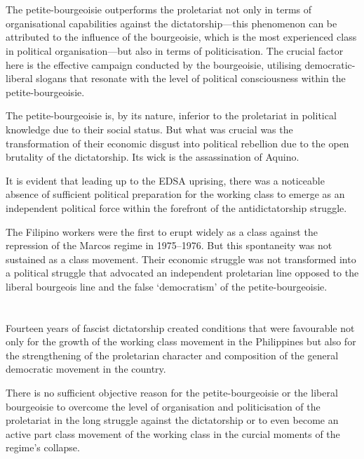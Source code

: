 \section{}
The petite-bourgeoisie outperforms the proletariat 
not only in terms of organisational capabilities 
against the dictatorship---this 
phenomenon can be attributed 
to the influence of the bourgeoisie, 
which is the most experienced class in political organisation---but 
also in terms of politicisation. 
The crucial factor here 
is the effective campaign conducted by the bourgeoisie, 
utilising democratic-liberal slogans 
that resonate with the level of political consciousness 
within the petite-bourgeoisie.

The petite-bourgeoisie is, by its nature,
inferior to the proletariat 
in political knowledge 
due to their social status. 
But what was crucial was the transformation 
of their economic disgust into political rebellion 
due to the open brutality of the dictatorship. 
Its wick is the assassination of Aquino.

It is evident that leading up to the EDSA uprising, 
there was a noticeable absence of 
sufficient political preparation for 
the working class to emerge 
as an independent political force 
within the forefront of the antidictatorship struggle.

The Filipino workers were the first to erupt 
widely as a class against the repression 
of the Marcos regime in 1975--1976. 
But this spontaneity was not sustained as a class movement. 
Their economic struggle was not transformed 
into a political struggle 
that advocated an independent proletarian line 
opposed to the liberal bourgeois line 
and the false `democratism' of the petite-bourgeoisie.


\section{}
Fourteen years of fascist dictatorship 
created conditions that were favourable not only 
for the growth of the working class movement in the Philippines 
but also for the strengthening of the proletarian character 
and composition of the general democratic movement in the country.

There is no sufficient objective reason 
for the petite-bourgeoisie or the liberal bourgeoisie 
to overcome the level of organisation and politicisation of the proletariat 
in the long struggle against the dictatorship 
or to even become an active part 
class movement of the working class 
in the curcial moments of the regime's collapse.

